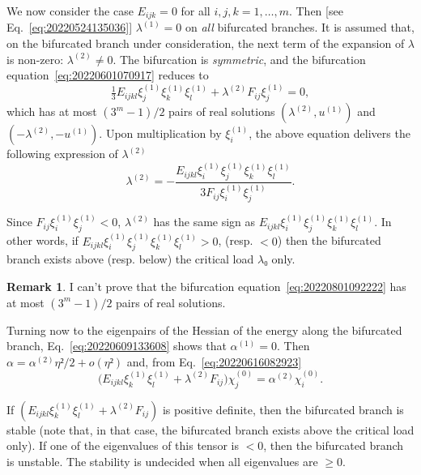 \documentclass[12pt, final]{scrartcl}
\theoremstyle{definition}
\newtheorem{remark}{Remark}
\newcommand{\order}[2][1]{#2^{(#1)}}
\begin{document}
We now consider the case \(E_{ijk}=0\) for all \(i, j, k = 1, \ldots, m\). Then
[see Eq.~\eqref{eq:20220524135036}] \(\order[1]λ = 0\) on \emph{all} bifurcated
branches. It is assumed that, on the bifurcated branch under consideration, the
next term of the expansion of \(λ\) is non-zero: \(\order[2]λ ≠ 0\). The bifurcation is
\emph{symmetric}, and the bifurcation equation~\eqref{eq:20220601070917} reduces
to
\begin{equation}
  \label{eq:20220801092222}
  \tfrac{1}{3} E_{ijkl} \order[1]{ξ_j} \order[1]{ξ_k} \order[1]{ξ_l}  + \order[2]λ F_{ij} \order[1]{ξ_j} = 0,
\end{equation}
which has at most \((3^m - 1) / 2\) pairs of real solutions \((\order[2]λ, \order[1]u)\) and
\((- \order[2]λ, - \order[1]u)\). Upon multiplication by \(\order[1]{ξ_i}\), the above equation delivers
the following expression of \(\order[2]λ\)
\begin{equation}
  \label{eq:20220801093236}
  \order[2]λ = -\frac{E_{ijkl} \order[1]{ξ_i} \order[1]{ξ_j} \order[1]{ξ_k} \order[1]{ξ_l}}{3 F_{ij} \order[1]{ξ_i} \order[1]{ξ_j}}.
\end{equation}

Since \(F_{ij} \order[1]{ξ_i} \order[1]{ξ_j} < 0\), \(\order[2]λ\) has the same sign as
\(E_{ijkl}\order[1]{ξ_i} \order[1]{ξ_j} \order[1]{ξ_k} \order[1]{ξ_l}\). In other words, if
\(E_{ijkl}\order[1]{ξ_i} \order[1]{ξ_j} \order[1]{ξ_k} \order[1]{ξ_l} > 0\), (resp. \(<0\)) then the bifurcated branch
exists above (resp. below) the critical load \(λ₀\) only.

\begin{remark}
  I can't prove that the bifurcation equation~\eqref{eq:20220801092222} has at
  most \((3^m - 1) / 2\) pairs of real solutions.
\end{remark}

Turning now to the eigenpairs of the Hessian of the energy along
the bifurcated branch, Eq.~\eqref{eq:20220609133608} shows that \(\order[1]α = 0\). Then
\(α = \order[2]α η² / 2 + o(η²)\) and, from Eq.~\eqref{eq:20220616082923}
\begin{equation}
  \bigl(E_{ijkl} \order[1]{ξ_k} \order[1]{ξ_l} + \order[2]λ F_{ij} \bigr) \order[0]{χ_j} = \order[2]α \order[0]{χ_i}.
\end{equation}

If \((E_{ijkl} \order[1]{ξ_k} \order[1]{ξ_l} + \order[2]λ F_{ij} )\) is positive definite, then the
bifurcated branch is stable (note that, in that case, the bifurcated branch
exists above the critical load only). If one of the eigenvalues of this tensor
is \(<0\), then the bifurcated branch is unstable. The stability is undecided
when all eigenvalues are \(≥ 0\).
\end{document}
